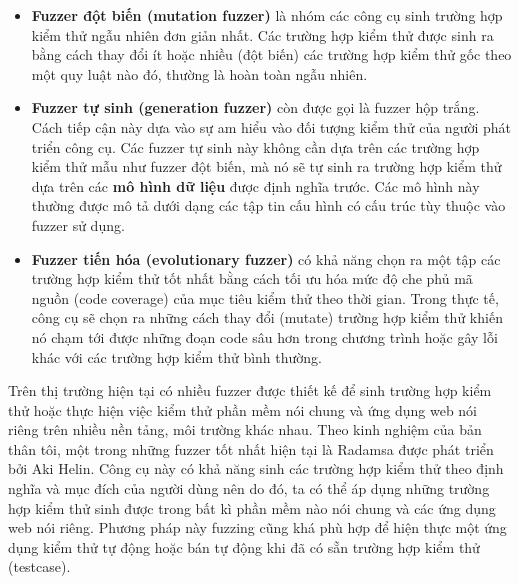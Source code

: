\begin{itemize}
    \item \textbf{Fuzzer đột biến (mutation fuzzer)} là nhóm các công cụ sinh trường hợp kiểm thử ngẫu nhiên đơn giản nhất. Các trường hợp kiểm thử được sinh ra bằng cách thay đổi ít hoặc nhiều (đột biến) các trường hợp kiểm thử gốc theo một quy luật nào đó, thường là hoàn toàn ngẫu nhiên.
    \item \textbf{Fuzzer tự sinh (generation fuzzer)} còn được gọi là fuzzer hộp trắng. Cách tiếp cận này dựa vào sự am hiểu vào đối tượng kiểm thử của người phát triển công cụ. Các fuzzer tự sinh này không cần dựa trên các trường hợp kiểm thử mẫu như fuzzer đột biến, mà nó sẽ tự sinh ra trường hợp kiểm thử dựa trên các \textbf{mô hình dữ liệu} được định nghĩa trước. Các mô hình này thường được mô tả dưới dạng các tập tin cấu hình có cấu trúc tùy thuộc vào fuzzer sử dụng.
    \item \textbf{Fuzzer tiến hóa (evolutionary fuzzer)} có khả năng chọn ra một tập các trường hợp kiểm thử tốt nhất bằng cách tối ưu hóa mức độ che phủ mã nguồn (code coverage) của mục tiêu kiểm thử theo thời gian. Trong thực tế, công cụ sẽ chọn ra những cách thay đổi (mutate) trường hợp kiểm thử khiến nó chạm tới được những đoạn code sâu hơn trong chương trình hoặc gây lỗi khác với các trường hợp kiểm thử bình thường.
\end{itemize}
Trên thị trường hiện tại có nhiều fuzzer được thiết kế để sinh trường hợp kiểm thử hoặc thực hiện việc kiểm thử phần mềm nói chung và ứng dụng web nói riêng trên nhiều nền tảng, môi trường khác nhau. Theo kinh nghiệm của bản thân tôi, một trong những fuzzer tốt nhất hiện tại là Radamsa \parencite{radamsa-gitlab} được phát triển bởi Aki Helin. Công cụ này có khả năng sinh các trường hợp kiểm thử theo định nghĩa và mục đích của người dùng nên do đó, ta có thể áp dụng những trường hợp kiểm thử sinh được trong bất kì phần mềm nào nói chung và các ứng dụng web nói riêng. Phương pháp này fuzzing cũng khá phù hợp để hiện thực một ứng dụng kiểm thử tự động hoặc bán tự động khi đã có sẵn trường hợp kiểm thử (testcase).